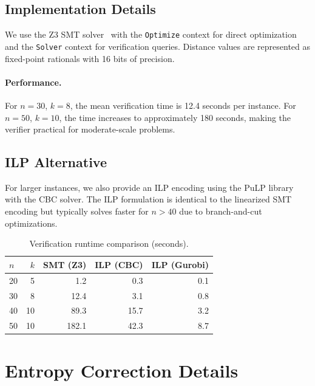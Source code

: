 \documentclass[11pt,a4paper]{article}
\begin{document}
\subsection{Implementation Details}

We use the Z3 SMT solver~\citep{demoura2008z3} with the
\texttt{Optimize} context for direct optimization and the
\texttt{Solver} context for verification queries.  Distance
values are represented as fixed-point rationals with 16 bits
of precision.

\paragraph{Performance.}
For $n = 30$, $k = 8$, the mean verification time is 12.4
seconds per instance.  For $n = 50$, $k = 10$, the time
increases to approximately 180 seconds, making the verifier
practical for moderate-scale problems.

\subsection{ILP Alternative}

For larger instances, we also provide an ILP encoding
using the PuLP library with the CBC solver.  The ILP
formulation is identical to the linearized SMT encoding
but typically solves faster for $n > 40$ due to branch-and-cut
optimizations.

\begin{table}[h]
\centering
\caption{Verification runtime comparison (seconds).}
\label{tab:solver_comparison}
\begin{tabular}{@{}lrrrr@{}}
\toprule
$n$ & $k$ & SMT (Z3) & ILP (CBC) & ILP (Gurobi) \\
\midrule
20 & 5  & 1.2   & 0.3   & 0.1 \\
30 & 8  & 12.4  & 3.1   & 0.8 \\
40 & 10 & 89.3  & 15.7  & 3.2 \\
50 & 10 & 182.1 & 42.3  & 8.7 \\
\bottomrule
\end{tabular}
\end{table}

\section{Entropy Correction Details}\label{app:entropy}
\end{document}
